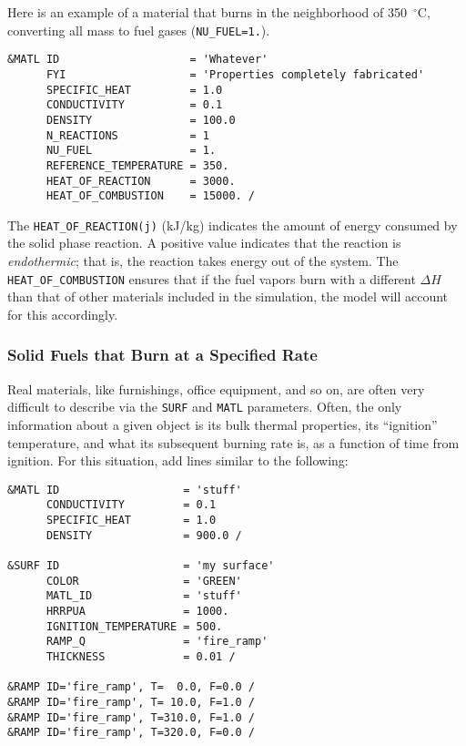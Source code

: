\documentclass[11pt]{book}
\newcommand{\ct}{\tt\small}
\begin{document}
Here is an example of a material that burns in the neighborhood of 350~$^\circ$C,
converting all mass to fuel gases ({\ct NU\_FUEL=1.}).

\footnotesize
\begin{verbatim}
&MATL ID                    = 'Whatever'
      FYI                   = 'Properties completely fabricated'
      SPECIFIC_HEAT         = 1.0
      CONDUCTIVITY          = 0.1
      DENSITY               = 100.0
      N_REACTIONS           = 1
      NU_FUEL               = 1.
      REFERENCE_TEMPERATURE = 350.
      HEAT_OF_REACTION      = 3000.
      HEAT_OF_COMBUSTION    = 15000. /
\end{verbatim}
\normalsize
\noindent
The {\ct HEAT\_OF\_REACTION(j)} (kJ/kg) indicates the amount of energy
consumed by the solid phase reaction. A positive value indicates that
the reaction is {\em endothermic}; that is, the reaction takes energy
out of the system. The {\ct HEAT\_OF\_COMBUSTION} ensures that if the
fuel vapors burn with a different $\Delta H$ than that of other
materials included in the simulation, the model will account for this
accordingly.

\subsubsection{Solid Fuels that Burn at a Specified Rate}

Real materials, like furnishings, office equipment, and so on, are
often very difficult to describe via the {\ct SURF} and {\ct MATL}
parameters. Often, the only information about a given object is its
bulk thermal properties, its ``ignition'' temperature, and what its
subsequent burning rate is, as a function of time from ignition. For
this situation, add lines similar to the following:

\footnotesize
\begin{verbatim}
&MATL ID                   = 'stuff'
      CONDUCTIVITY         = 0.1
      SPECIFIC_HEAT        = 1.0
      DENSITY              = 900.0 /

&SURF ID                   = 'my surface'
      COLOR                = 'GREEN'
      MATL_ID              = 'stuff'
      HRRPUA               = 1000.
      IGNITION_TEMPERATURE = 500.
      RAMP_Q               = 'fire_ramp'
      THICKNESS            = 0.01 /

&RAMP ID='fire_ramp', T=  0.0, F=0.0 /
&RAMP ID='fire_ramp', T= 10.0, F=1.0 /
&RAMP ID='fire_ramp', T=310.0, F=1.0 /
&RAMP ID='fire_ramp', T=320.0, F=0.0 /
\end{verbatim} \normalsize
\end{document}
